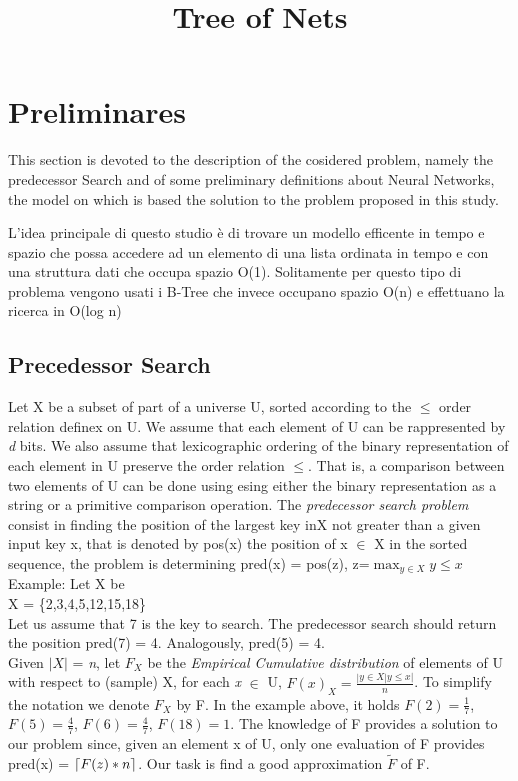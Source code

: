 \documentclass[]{article}
\title{\textbf{Tree of Nets}}
\author{\vspace{-7ex}}
\date{\vspace{-10ex}}
\DeclarePairedDelimiter{\ceil}{\lceil}{\rceil}
\begin{document}
	\maketitle
	
	\section{Preliminares}
	This section is devoted to the description of the cosidered problem, namely the predecessor Search and of some preliminary definitions about Neural Networks, the model on which is based the solution to the problem proposed in this study.
	
	L'idea principale di questo studio è di trovare un modello efficente in tempo e spazio che possa accedere ad un elemento di una lista ordinata in tempo e con una struttura dati che occupa spazio O(1). Solitamente per questo tipo di problema vengono usati i B-Tree che invece occupano spazio O(n) e effettuano la ricerca in O(log n)
	
	\subsection{Precedessor Search}
	Let X be a subset of part of a universe U, sorted according to the $\leq$ order relation definex on U. We assume that each element of U can be rappresented by \textit{d} bits. We also assume that lexicographic ordering of the binary representation of each element in U preserve the order relation $\leq$. That is, a comparison between two elements of U can be done using esing either the binary representation as a string or a primitive comparison operation. 
	The \textit{predecessor search problem} consist in finding the position of the largest key inX not greater than a given input key x, that is denoted by pos(x) the position of x $\in$ X in the sorted sequence, the problem is determining pred(x) = pos(z), z=$\max_{y \in X} y \leq x$ \\
	
	Example: Let X be \\
	 
	X = \{2,3,4,5,12,15,18\} \\
	
	Let us assume that 7 is the key to search. The predecessor search should return the position pred(7) = 4. Analogously, pred(5) = 4. \\
	
	
	Given $|X|$ = \textit{n}, let $F_{X}$ be the \textit{Empirical Cumulative distribution} of elements of U with respect to (sample) X, for each \textit{x} $\in$ U, $ F(x)_{X}={\frac{|y \in X | y \leq x|}{n}}$. To simplify the notation we denote $F_{X}$ by F. In the example above, it holds $F(2)=\frac{1}{7}$, $F(5)=\frac{4}{7}$, $F(6)=\frac{4}{7}$, $F(18)=1$. The knowledge of F provides a solution to our problem since, given an element x of U, only one evaluation of F provides pred(x) = $\ceil{F(z) * n}$.
	Our task is find a good approximation $\tilde{F}$ of F.
	
\end{document}
